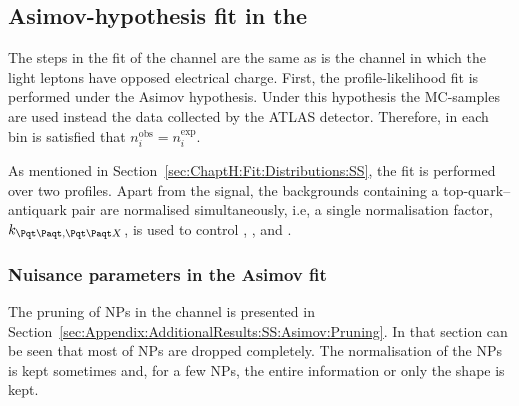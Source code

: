 
\FloatBarrier %

\subsection{Asimov-hypothesis fit in the \dilepSStau}
\label{sec:ChaptH:Fit:ASIMOV:SS}
The steps in the fit of the \dilepSStau channel are the same as is the channel in which the light leptons have
opposed electrical charge. First, the profile-likelihood fit is performed under the Asimov hypothesis.
Under this hypothesis the MC-samples are used instead the data collected by the ATLAS detector.
Therefore, in each bin is satisfied that $n_{i}^{\text{obs}}=n_{i}^{\text{exp}}$.

As mentioned in Section~\ref{sec:ChaptH:Fit:Distributions:SS}, the \dilepSStau fit is performed 
over two profiles. Apart from the \tHq signal, the backgrounds containing a top-quark--antiquark pair
are normalised simultaneously, i.e, a single normalisation factor, $k_{\ttbar, \ttX}$, is used to control \ttbar, \ttW, \ttH and \ttZ.




\subsubsection{Nuisance parameters in the \dilepSStau Asimov fit}
\label{sec:ChaptH:Fit:ASIMOV:SS:NPs}
The pruning of NPs in the \dilepSStau channel is presented in Section~\ref{sec:Appendix:AdditionalResults:SS:Asimov:Pruning}.
In that section can be seen that most of NPs are dropped completely. The normalisation of the NPs is kept sometimes and, for
a few NPs, the entire information or only the shape is kept.

